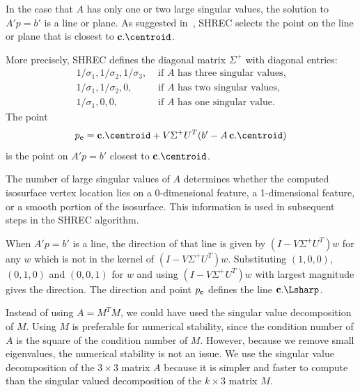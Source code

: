 In the case that $A$ has only one or two large singular values,
the solution to $A' p = b'$ is a line or plane.
As suggested in~\cite{sw-dcss-02},
SHREC selects the point on the line or plane that is closest 
to $\cb.\centroid$.

More precisely, SHREC defines the diagonal matrix $\Sigma^+$
with diagonal entries:
\begin{equation*}
\begin{array}{ll}
1/\sigma_1, 1/\sigma_2, 1/\sigma_3, 
  & \mbox{ if $A$ has three singular values,}\\
1/\sigma_1, 1/\sigma_2, 0, 
  & \mbox{ if $A$ has two singular values,}\\
1/\sigma_1, 0, 0, 
  & \mbox{ if $A$ has one singular value.}
\end{array}
\end{equation*}
The point
\begin{equation}
\label{eqn:Lindstrom}
p_\cb = \cb.\centroid + V \Sigma^+ U^T (b' - A \, \cb.\centroid) 
\end{equation}
is the point on $A' p = b'$ closest to $\cb.\centroid$.

The number of large singular values of $A$ determines
whether the computed isosurface vertex location lies 
on a 0-dimensional feature, a 1-dimensional feature, 
or a smooth portion of the isosurface.
This information is used in subsequent steps in the SHREC algorithm.

When $A' p = b'$ is a line,
the direction of that line is given by $(I - V \Sigma^+ U^T ) w$
for any $w$ which is not in the kernel of $(I - V \Sigma^+ U^T ) w$.
Substituting $(1,0,0)$, $(0,1,0)$ and $(0,0,1)$ for $w$
and using $(I - V \Sigma^+ U^T ) w$ with largest magnitude
gives the direction.
The direction and point $p_{\mathbf{c}}$ defines the line $\cb.\Lsharp$.

Instead of using $A = M^T M$,
we could have used the singular value decomposition of $M$.
Using $M$ is preferable for numerical stability,
since the condition number of $A$ is the square of the condition number of $M$.
However, because we remove small eigenvalues,
the numerical stability is not an issue.
We use the singular value decomposition of the $3 \times 3$ matrix $A$
because it is simpler and faster to compute 
than the singular valued decomposition of the $k \times 3$ matrix $M$.


